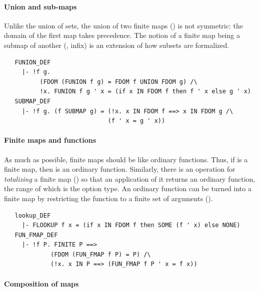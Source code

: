 \paragraph {Union and sub-maps}

Unlike the union of sets, the union of two finite maps
() is not symmetric: the domain of the first map
takes precedence. The notion of a finite map being a submap of another
(, infix) is an extension of how subsets are
formalized.
\begin{hol}
\begin{verbatim}
   FUNION_DEF
     |- !f g.
          (FDOM (FUNION f g) = FDOM f UNION FDOM g) /\
          !x. FUNION f g ' x = (if x IN FDOM f then f ' x else g ' x)
   SUBMAP_DEF
     |- !f g. (f SUBMAP g) = (!x. x IN FDOM f ==> x IN FDOM g /\
                             (f ' x = g ' x))
\end{verbatim}
\end{hol}

\paragraph {Finite maps and functions}

As much as possible, finite maps should be like ordinary functions.
Thus, if  is a finite map, then  is an
ordinary function. Similarly, there is an operation for
\emph{totalizing} a finite map (\holtxt{lookup}) so that an
application of it returns an ordinary function, the range of which is
the option type.  An ordinary function can be turned into a finite map
by restricting the function to a finite set of arguments
(\ml{FUN\_FMAP\_DEF}).
%
\begin{hol}
\begin{verbatim}
   lookup_DEF
     |- FLOOKUP f x = (if x IN FDOM f then SOME (f ' x) else NONE)
   FUN_FMAP_DEF
     |- !f P. FINITE P ==>
             (FDOM (FUN_FMAP f P) = P) /\
             (!x. x IN P ==> (FUN_FMAP f P ' x = f x))
\end{verbatim}
\end{hol}

\paragraph {Composition of maps}

